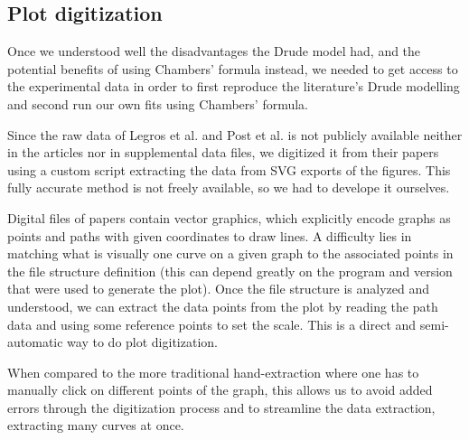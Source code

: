 \subsection{Plot digitization}
Once we understood well the disadvantages the Drude model had, 
and the potential benefits of using Chambers' formula instead, 
we needed to get access to the experimental data in order to 
first reproduce the literature's Drude modelling and 
second run our own fits using Chambers' formula.

Since the raw data of Legros et al. \cite{legros2022} and Post et al. \cite{post2021} is not publicly available neither in the articles nor in supplemental data files, 
we digitized it from their papers using a custom script extracting the data from SVG exports of the figures.
This fully accurate method is not freely available, so we had to develope it ourselves.

Digital files of papers contain vector graphics, 
which explicitly encode graphs as points and paths with given coordinates to draw lines. 
A difficulty lies in matching what is visually one curve on a given graph to the associated points in the file structure definition 
(this can depend greatly on the program and version that were used to generate the plot). 
Once the file structure is analyzed and understood, 
we can extract the data points from the plot by reading the path data and using some reference points to set the scale.
This is a direct and semi-automatic way to do plot digitization.
 
When compared to the more traditional hand-extraction where one has to manually click on different points of the graph, 
this allows us to avoid added errors through the digitization process 
and to streamline the data extraction, extracting many curves at once.
